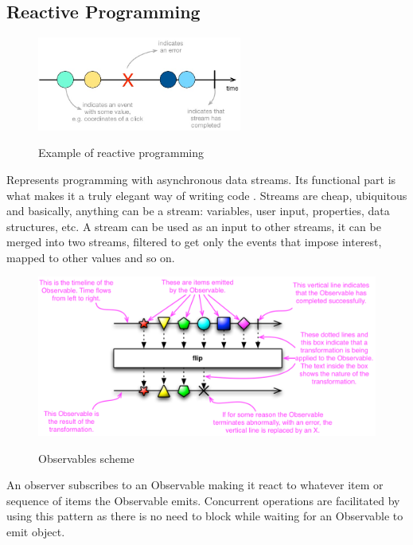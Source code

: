 \documentclass[12 pct]{report}
\begin{document}
\subsection*{Reactive Programming}

\begin{figure}[H]
\includegraphics[width=0.6\textwidth]{streams}
\centering
\label{fig:reactive-pgrogramming}
\caption{Example of reactive programming }
\end{figure}

Represents programming with asynchronous data streams. Its functional part is what makes it a truly elegant way of writing code \cite{reactivex}. Streams are cheap, ubiquitous and basically, anything can be a stream: variables, user input, properties, data structures, etc. A stream can be used as an input to other streams, it can be merged into two streams, filtered to get only the events that impose interest, mapped to other values and so on.

\begin{figure}[H]
\includegraphics[width=1.0\textwidth]{observable-doc}
\centering
\label{fig:feature-points}
\caption{ Observables scheme \cite{reactivex} }
\end{figure}

An observer subscribes to an Observable \cite{meijer2010reactive} making it react to whatever item or sequence of items the Observable emits. Concurrent operations are facilitated by using this pattern as there is no need to block while waiting for an Observable to emit object.
\end{document}
